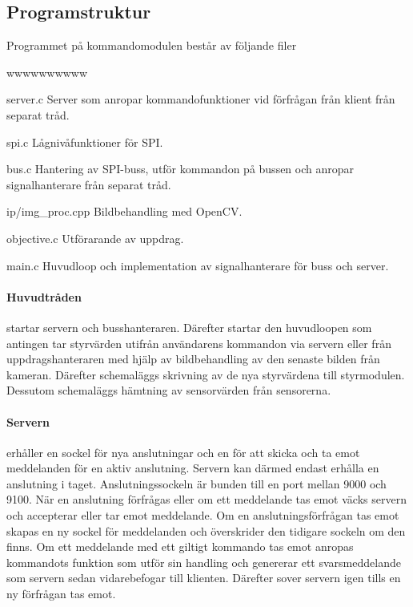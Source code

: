 \documentclass[tekniskrapport/tech.tex]{subfiles}
\begin{document}
\subsection{Programstruktur}
Programmet på kommandomodulen består av följande filer

\begin{labeling}{wwwwwwwwww}
    \item[server.c] Server som anropar kommandofunktioner vid förfrågan från
        klient från separat tråd.
	\item[spi.c] Lågnivåfunktioner för SPI.
    \item[bus.c] Hantering av SPI-buss, utför kommandon på bussen och anropar
        signalhanterare från separat tråd.
    \item[ip/img\_proc.cpp] Bildbehandling med OpenCV.
    \item[objective.c] Utförarande av uppdrag.
    \item[main.c] Huvudloop och implementation av signalhanterare för buss och
        server.
\end{labeling}

\paragraph{Huvudtråden} startar servern och busshanteraren. Därefter startar
den huvudloopen som antingen tar styrvärden utifrån användarens kommandon via
servern eller från uppdragshanteraren med hjälp av bildbehandling av den
senaste bilden från kameran. Därefter schemaläggs skrivning av de nya
styrvärdena till styrmodulen. Dessutom schemaläggs hämtning av sensorvärden
från sensorerna.

\paragraph{Servern} erhåller en sockel för nya anslutningar och en för att
skicka och ta emot meddelanden för en aktiv anslutning. Servern kan därmed
endast erhålla en anslutning i taget. Anslutningssockeln är bunden till en port
mellan 9000 och 9100. När en anslutning förfrågas eller om ett meddelande tas
emot väcks servern och accepterar eller tar emot meddelande. Om en
anslutningsförfrågan tas emot skapas en ny sockel för meddelanden och
överskrider den tidigare sockeln om den finns. Om ett meddelande med ett
giltigt kommando tas emot anropas kommandots funktion som utför sin handling
och genererar ett svarsmeddelande som servern sedan vidarebefogar till
klienten. Därefter sover servern igen tills en ny förfrågan tas emot.
\end{document}
